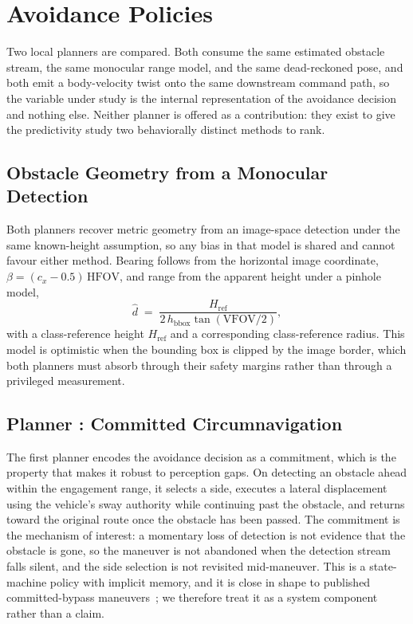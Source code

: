\section{Avoidance Policies}
\label{sec:planners}

Two local planners are compared. Both consume the same estimated obstacle
stream, the same monocular range model, and the same dead-reckoned pose, and
both emit a body-velocity twist onto the same downstream command path, so the
variable under study is the internal representation of the avoidance decision
and nothing else. Neither planner is offered as a contribution: they exist to
give the predictivity study two behaviorally distinct methods to rank.

\subsection{Obstacle Geometry from a Monocular Detection}

Both planners recover metric geometry from an image-space detection under the
same known-height assumption, so any bias in that model is shared and cannot
favour either method. Bearing follows from the horizontal image coordinate,
$\beta = (c_x - 0.5)\,\mathrm{HFOV}$, and range from the apparent height
under a pinhole model,
\begin{equation}
  \hat{d} \;=\; \frac{H_{\mathrm{ref}}}{2\,h_{\mathrm{bbox}}
                \tan(\mathrm{VFOV}/2)},
  \label{eq:monorange}
\end{equation}
with a class-reference height $H_{\mathrm{ref}}$ and a corresponding
class-reference radius. This model is optimistic when the bounding box is
clipped by the image border, which both planners must absorb through their
safety margins rather than through a privileged measurement.

\subsection{Planner \PC{}: Committed Circumnavigation}

The first planner encodes the avoidance decision as a commitment, which is
the property that makes it robust to perception gaps. On detecting an
obstacle ahead within the engagement range, it selects a side, executes a
lateral displacement using the vehicle's sway authority while continuing
past the obstacle, and returns toward the original route once the obstacle
has been passed. The commitment is the mechanism of interest: a momentary
loss of detection is not evidence that the obstacle is gone, so the maneuver
is not abandoned when the detection stream falls silent, and the side
selection is not revisited mid-maneuver. This is a state-machine policy with
implicit memory, and it is close in shape to published committed-bypass
maneuvers~\cite{zhang2022binocula}; we therefore treat it as a system
component rather than a claim.

